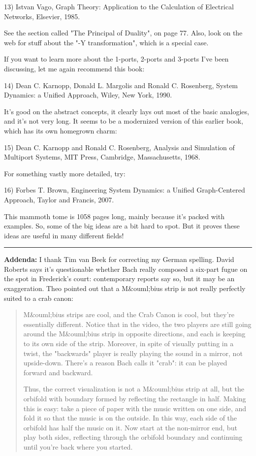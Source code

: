 13) Istvan Vago, Graph Theory: Application to the Calculation of
Electrical Networks, Elsevier, 1985.  

See the section called "The Principal of Duality", on page 77.
Also, look on the web for stuff about the "\Delta -Y transformation",
which is a special case.

If you want to learn more about the 1-ports, 2-ports and 3-ports I've
been discussing, let me again recommend this book:

14) Dean C. Karnopp, Donald L. Margolis and Ronald C. Rosenberg,
System Dynamics: a Unified Approach, Wiley, New York, 1990.

It's good on the abstract concepts, it clearly lays out most of the
basic analogies, and it's not very long.  It seems to be a modernized
version of this earlier book, which has its own homegrown charm:

15) Dean C. Karnopp and Ronald C. Rosenberg, Analysis and Simulation of
Multiport Systems, MIT Press, Cambridge, Massachusetts, 1968.

For something vastly more detailed, try:

16) Forbes T. Brown, Engineering System Dynamics: a Unified 
Graph-Centered Approach, Taylor and Francis, 2007.

This mammoth tome is 1058 pages long, mainly because it's packed with
examples.  So, some of the big ideas are a bit hard to spot.  But it
proves these ideas are useful in many different fields!

\par\noindent\rule{\textwidth}{0.4pt}
\textbf{Addenda:} 
I thank Tim van Beek for correcting my German spelling.
David Roberts says it's questionable whether Bach really composed a
six-part fugue on the spot in Frederick's court: contemporary reports
say so, but it may be an exaggeration.  Theo pointed out that
a M&ouml;bius strip is not really perfectly suited to a crab canon:

\begin{quote}
   M&ouml;bius strips are cool, and the Crab Canon is cool, but they're
   essentially different.  Notice that in the video, the two players
   are still going around the M&ouml;bius strip in opposite directions, and
   each is keeping to its own side of the strip.  Moreover, in spite
   of visually putting in a twist, the "backwards" player is
   really playing the sound in a mirror, not upside-down.  There's a
   reason Bach calls it "crab": it can be played forward and
   backward.

   Thus, the correct visualization is not a M&ouml;bius strip at all, but 
   the orbifold with boundary formed by reflecting the rectangle in 
   half.  Making this is easy: take a piece of paper with the music 
   written on one side, and fold it so that the music is on the outside. 
   In this way, each side of the orbifold has half the music on it.  
   Now start at the non-mirror end, but play both sides, reflecting 
   through the orbifold boundary and continuing until you're back where 
   you started.
\end{quote}

